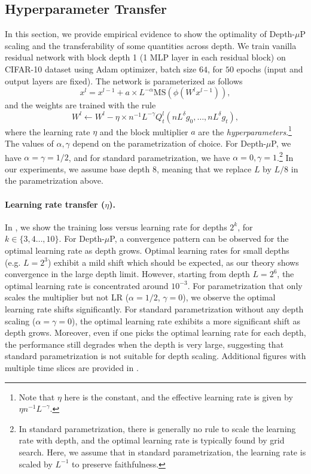 \subsection{Hyperparameter Transfer}
In this section, we provide empirical evidence to show the optimality of Depth-$\mu$P scaling and the transferability of some quantities across depth. We train vanilla residual network with block depth 1 (1 MLP layer in each residual block) on CIFAR-10 dataset using Adam optimizer, batch size $64$, for $50$ epochs (input and output layers are fixed). The network is parameterized as 
follows
$$
x^l = x^{l-1}+ a \times L^{-\alpha} \textrm{MS}(\phi(W^l x^{l-1})),
$$
and the weights are trained with the rule
$$
  W^{l}\gets W^{l}-\eta \times n^{-1} L^{-\gamma}Q^l_t(n L^{\delta} g_{0},\ldots,n L^{\delta} g_{t}),
$$
where the learning rate $\eta$ and the block multiplier $a$ are the \emph{hyperparameters}.\footnote{Note that $\eta$ here is the constant, and the effective learning rate is given by $\eta n^{-1} L^{-\gamma}$.} The values of $\alpha, \gamma$ depend on the parametrization of choice. For Depth-$\mu$P, we have $\alpha=\gamma=1/2$, and for standard parametrization, we have $\alpha=0,\gamma=1$.\footnote{In standard parametrization, there is generally no rule to scale the learning rate with depth, and the optimal learning rate is typically found by grid search. Here, we assume that in standard parametrization, the learning rate is scaled by $L^{-1}$ to preserve faithfulness.} In our experiments, we assume base depth $8$, meaning that we replace $L$ by $L/8$ in the parametrization above.

\paragraph{Learning rate transfer ($\eta$). }In , we show the training loss versus learning rate for depths $2^k$, for $k\in \{3,4\dots,10\}$. For Depth-$\mu$P, a convergence pattern can be observed for the optimal learning rate as depth grows. Optimal learning rates for small depths (e.g. $L=2^3$) exhibit a mild shift which should be expected, as our theory shows convergence in the large depth limit.  However, starting from depth $L=2^6$, the optimal learning rate is concentrated around $10^{-3}$. 
For parametrization that only scales the multiplier but not LR ($\alpha=1/2$, $\gamma=0$), we observe the optimal learning rate shifts significantly. 
For standard parametrization without any depth scaling  ($\alpha=\gamma=0$), the optimal learning rate exhibits a more significant shift as depth grows. Moreover, even if one picks the optimal learning rate for each depth, the performance still degrades when the depth is very large, suggesting that standard parametrization is not suitable for depth scaling. Additional figures with multiple time slices are provided in .

